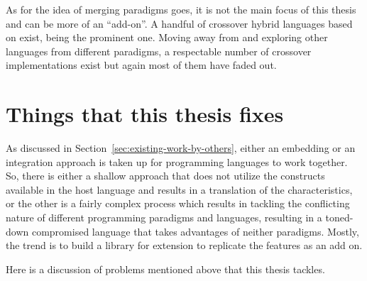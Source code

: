 \documentclass[thesis-solanki.tex]{subfiles}
\begin{document}
As for the idea of merging paradigms goes, it is not the main focus of this thesis and can be more of an
``add-on''.
A handful of crossover hybrid languages based on  exist,
 \cite{website:curry} being the prominent one.
Moving away from  and exploring other languages from different paradigms, a respectable number of
crossover implementations exist but again most of them have faded out.


\section{Things that this thesis fixes}\label{sec:things-fixed}

As discussed in Section~\ref{sec:existing-work-by-others},
either an embedding or an integration approach is taken up for programming languages to work together.
So, there is either a shallow approach that does not utilize the constructs available in the host language and
results in a translation of the characteristics, or the other is a fairly complex process which results in tackling
the conflicting nature of different programming paradigms and languages, resulting in a toned-down compromised
language that takes advantages of neither paradigms.
Mostly, the trend is to build a library for extension to replicate the features as an add on.


Here is a discussion of problems mentioned above that this thesis
tackles.
\end{document}
